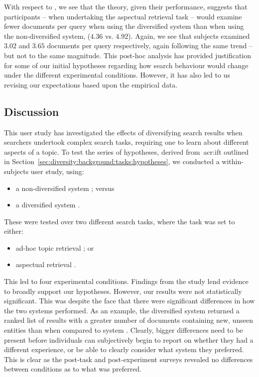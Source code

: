 With respect to , we see that the theory, given their performance, suggests that participants -- when undertaking the aspectual retrieval task -- would examine fewer documents per query when using the diversified system  than when using the non-diversified system,  ($4.36$ vs. $4.92$). Again, we see that subjects examined $3.02$ and $3.65$ documents per query respectively, again following the same trend -- but not to the same magnitude. This post-hoc analysis has provided justification for some of our initial hypotheses regarding how search behaviour would change under the different experimental conditions. However, it has also led to us revising our expectations based upon the empirical data.

\vspace*{-6mm}
\subsection{Discussion}
This user study has investigated the effects of diversifying search results when searchers undertook complex search tasks, requiring one to learn about different aspects of a topic. To test the series of hypotheses, derived from~\gls{acr:ift} outlined in Section~\ref{sec:diversity:background:tasks:hypotheses}, we conducted a within-subjects user study, using:

\begin{itemize}
    \item{a non-diversified system ; versus}
    \item{a diversified system .}
\end{itemize}

These were tested over two different search tasks, where the task was set to either:

\begin{itemize}
    \item{ad-hoc topic retrieval ; or}
    \item{aspectual retrieval .}
\end{itemize}

This led to four experimental conditions. Findings from the study lend evidence to broadly support our hypotheses. However, our results were not statistically significant. This was despite the face that there were significant differences in how the two systems performed. As an example, the diversified system  returned a ranked list of results with a greater number of documents containing new, unseen entities than when compared to system . Clearly, bigger differences need to be present before individuals can subjectively begin to report on whether they had a different experience, or be able to clearly consider what system they preferred. This is clear as the post-task and post-experiment surveys revealed no differences between conditions as to what was preferred.

